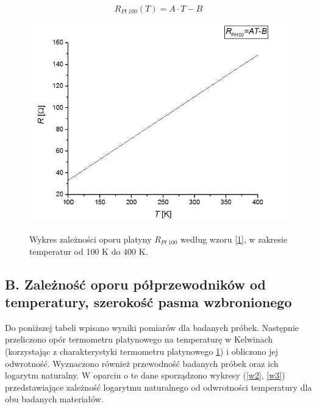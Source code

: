 \documentclass[11pt]{article}
\begin{document}
\begin{equation}\label{1}
R_{Pt\ 100} (T) = A\cdot T-B
\end{equation}

\begin{figure}[h!]
\centering
\caption{Wykres zależności oporu platyny $R_{Pt\ 100}$ według wzoru \ref{1}, w zakresie temperatur od 100 K do 400 K.}{\label{w1}}
\includegraphics[scale=0.5]{W1.jpg}
\end{figure}


\subsection*{B. Zależność oporu półprzewodników od temperatury, szerokość pasma wzbronionego}
Do poniższej tabeli wpisano wyniki pomiarów dla badanych próbek. Następnie przeliczono opór termometru platynowego na temperaturę w Kelwinach (korzystając 
z charakterystyki termometru platynowego \ref{w1}) i obliczono jej odwrotność. Wyznaczono również przewodność badanych próbek oraz ich logarytm naturalny.
W oparciu o te dane sporządzono wykresy (\ref{w2}, \ref{w3}) przedstawiające zależność logarytmu naturalnego od odwrotności temperatury dla obu badanych materiałów.
\end{document}

